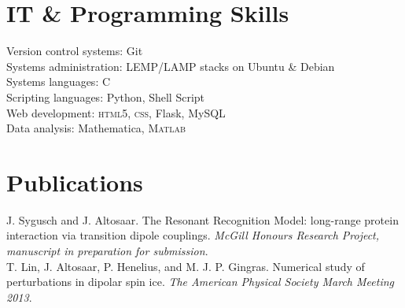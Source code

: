 \documentclass[12pt, letterpaper]{article}
\newcommand{\years}[1]{\marginnote{\normalsize #1}}
\begin{document}
\section*{IT \& Programming Skills}
Version control systems: Git\\
Systems administration: LEMP/LAMP stacks on Ubuntu \& Debian\\
Systems languages: C\\
Scripting languages: Python, Shell Script\\
Web development: \textsc{html}5, \textsc{css}, Flask, MySQL\\ 
Data analysis: Mathematica, \textsc{Matlab}
\section*{Publications}
\years{2013}J. Sygusch and J. Altosaar. The Resonant Recognition Model: long-range protein interaction via transition dipole couplings. \emph{McGill Honours Research Project, manuscript in preparation for submission}.\\
\years{2013}T. Lin, J. Altosaar, P. Henelius, and M. J. P. Gingras. Numerical study of perturbations in dipolar spin ice. \emph{The American Physical Society March Meeting 2013}.\\%
\end{document}
